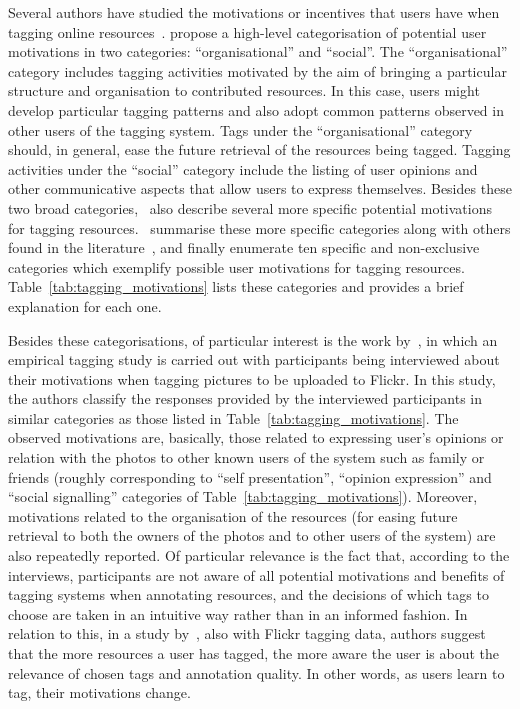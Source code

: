 Several authors have studied the motivations or incentives that users have when tagging online resources~\citep{Mathes2004,marlow2006,golder2006,Sen,Xu2006,Ames2007,Gupta2010}.
\cite{marlow2006} propose a high-level categorisation of potential user motivations in two categories: ``organisational'' and ``social''. 
The ``organisational'' category includes tagging activities motivated by the aim of bringing a particular structure and organisation to contributed resources. In this case, users might develop particular tagging patterns and also adopt common patterns observed in other users of the tagging system. Tags under the ``organisational'' category should, in general, ease the future retrieval of the resources being tagged.
Tagging activities under the ``social'' category include the listing of user opinions and other communicative aspects that allow users to express themselves.
Besides these two broad categories,~\cite{marlow2006} also describe several more specific potential motivations for tagging resources.~\cite{Gupta2010} summarise these more specific categories along with others found in the literature~\citep{Mathes2004,golder2006,Xu2006,Sen,Ames2007}, and finally enumerate ten specific and non-exclusive categories which exemplify possible user motivations for tagging resources. Table~\ref{tab:tagging_motivations} lists these categories and provides a brief explanation for each one.

Besides these categorisations, of particular interest is the work by~\cite{Ames2007}, in which an empirical tagging study is carried out with participants being interviewed about their motivations when tagging pictures to be uploaded to Flickr.
In this study, the authors classify the responses provided by the interviewed participants in similar categories as those listed in Table~\ref{tab:tagging_motivations}. The observed motivations are, basically, those related to expressing user's opinions or relation with the photos to other known users of the system such as family or friends (roughly corresponding to ``self presentation'', ``opinion expression'' and ``social signalling'' categories of Table~\ref{tab:tagging_motivations}). Moreover, motivations related to the organisation of the resources (for easing future retrieval to both the owners of the photos and to other users of the system) are also repeatedly reported. Of particular relevance is the fact that, according to the interviews, participants are not aware of all potential motivations and benefits of tagging systems when annotating resources, and the decisions of which tags to choose are taken in an intuitive way rather than in an informed fashion. In relation to this, in a study by~\cite{marlow2006}, also with Flickr tagging data, authors suggest that the more resources a user has tagged, the more aware the user is about the relevance of chosen tags and annotation quality. In other words, as users learn to tag, their motivations change.




